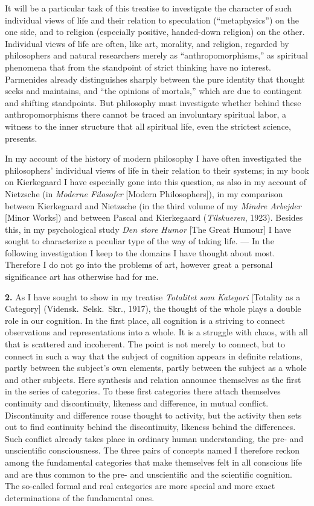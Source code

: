 \documentclass[12pt]{book}
\newcommand{\hnum}[1]{\textbf{#1.}\enspace}
\newcommand{\opage}[1]{\marginnote{\footnotesize\textit{[#1]}}}
\begin{document}
It will be a particular task of this treatise to investigate the character of such individual
views of life and their relation to speculation (``metaphysics'') on the one side, and to
religion (especially positive, handed-down religion) on the other. Individual views of life are
often, like art, morality, and religion, regarded by philosophers and natural researchers merely
as ``anthropomorphisms,'' as spiritual phenomena that from the standpoint of strict thinking have
no interest. Parmenides already distinguishes sharply between the pure identity that thought
seeks and maintains, and ``the opinions of mortals,'' which are due to contingent and shifting
standpoints. But philosophy must investigate whether behind these anthropomorphisms there cannot
be traced an involuntary spiritual labor, a witness to the inner structure that all spiritual
life, even the strictest science, presents.

In my account of the history of modern philosophy I have often investigated the philosophers'
individual views of life in their relation to their systems; in my book on Kierkegaard I have
especially gone into this question, as also in my account of Nietzsche (in \textit{Moderne
Filosofer} [Modern Philosophers]), in my comparison between Kierkegaard and Nietzsche (in the
third volume of my \textit{Mindre Arbejder} [Minor Works]) and between Pascal and Kierkegaard
(\textit{Tilskueren}, 1923). Besides this, in my psychological study \textit{Den store Humor}
[The Great Humour] I have sought to characterize a peculiar type of the way of taking life. ---
In the following investigation I keep to the domains I have thought about most. Therefore I do
not go into the problems of art, however great a personal significance art has otherwise had for
me.

\hnum{2} As I have sought to show in my treatise \textit{Totalitet \opage{9}som Kategori} [Totality as a
Category] (Vidensk.\ Selsk.\ Skr., 1917), the thought of the whole plays a double role in our
cognition. In the first place, all cognition is a striving to connect observations and
representations into a whole. It is a struggle with chaos, with all that is scattered and
incoherent. The point is not merely to connect, but to connect in such a way that the subject of
cognition appears in definite relations, partly between the subject's own elements, partly
between the subject as a whole and other subjects. Here synthesis and relation announce
themselves as the first in the series of categories. To these first categories there attach
themselves continuity and discontinuity, likeness and difference, in mutual conflict.
Discontinuity and difference rouse thought to activity, but the activity then sets out to find
continuity behind the discontinuity, likeness behind the differences. Such conflict already takes
place in ordinary human understanding, the pre- and unscientific consciousness. The three pairs
of concepts named I therefore reckon among the fundamental categories that make themselves felt
in all conscious life and are thus common to the pre- and unscientific and the scientific
cognition. The so-called formal and real categories are more special and more exact
determinations of the fundamental ones.
\end{document}
